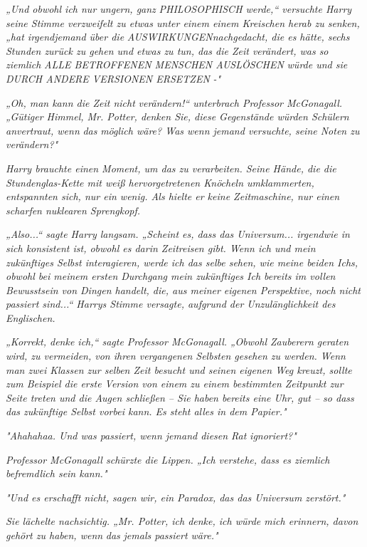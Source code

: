 {\emph{„Und obwohl ich nur ungern, ganz} \emph{\emph{PHILOSOPHISCH werde,}“ versuchte Harry seine Stimme verzweifelt zu etwas unter einem einem Kreischen herab zu senken, „hat irgendjemand über die} \emph{\emph{AUSWIRKUNGEN}nachgedacht, die es hätte, sechs Stunden zurück zu gehen und etwas zu tun, das die Zeit verändert, was so ziemlich} \emph{\emph{ALLE BETROFFENEN MENSCHEN AUSLÖSCHEN}} \emph{würde und sie} \emph{\emph{DURCH ANDERE VERSIONEN ERSETZEN}} \emph{-"}

\emph{„Oh, man kann die Zeit nicht} \emph{\emph{verändern!}“ unterbrach Professor McGonagall. „Gütiger Himmel, Mr. Potter, denken Sie, diese Gegenstände würden Schülern anvertraut, wenn} \emph{\emph{das}} \emph{möglich wäre? Was wenn jemand versuchte, seine Noten zu verändern?"}

\emph{Harry brauchte einen Moment, um das zu verarbeiten. Seine Hände, die die Stundenglas-Kette mit weiß hervorgetretenen Knöcheln umklammerten, entspannten sich, nur ein wenig. Als hielte er keine Zeitmaschine, nur einen scharfen nuklearen Sprengkopf.}

\emph{„Also...“ sagte Harry langsam. „Scheint es, dass das Universum... irgendwie in sich konsistent ist, obwohl es darin Zeitreisen gibt. Wenn ich und mein zukünftiges Selbst interagieren, werde ich das selbe sehen, wie meine beiden Ichs, obwohl bei meinem ersten Durchgang mein zukünftiges Ich bereits im vollen Bewusstsein von Dingen handelt, die, aus meiner eigenen Perspektive, noch nicht passiert sind...“ Harrys Stimme versagte, aufgrund der Unzulänglichkeit des Englischen.}

\emph{„Korrekt, denke ich,“ sagte Professor McGonagall. „Obwohl Zauberern geraten wird, zu vermeiden, von ihren vergangenen Selbsten gesehen zu werden. Wenn man zwei Klassen zur selben Zeit besucht und seinen eigenen Weg kreuzt, sollte zum Beispiel die erste Version von einem zu einem bestimmten Zeitpunkt zur Seite treten und die Augen schließen -- Sie haben bereits eine Uhr, gut -- so dass das zukünftige Selbst vorbei kann. Es steht alles in dem Papier."}

\emph{"Ahahahaa. Und was passiert, wenn jemand diesen Rat} \emph{\emph{ignoriert?}"}

\emph{Professor McGonagall schürzte die Lippen. „Ich verstehe, dass es ziemlich befremdlich sein kann."}

\emph{"Und es erschafft nicht, sagen wir, ein Paradox, das das Universum zerstört."}

\emph{Sie lächelte nachsichtig. „Mr. Potter, ich denke, ich würde mich erinnern, davon gehört zu haben, wenn} \emph{\emph{das}} \emph{jemals passiert wäre."}

}

